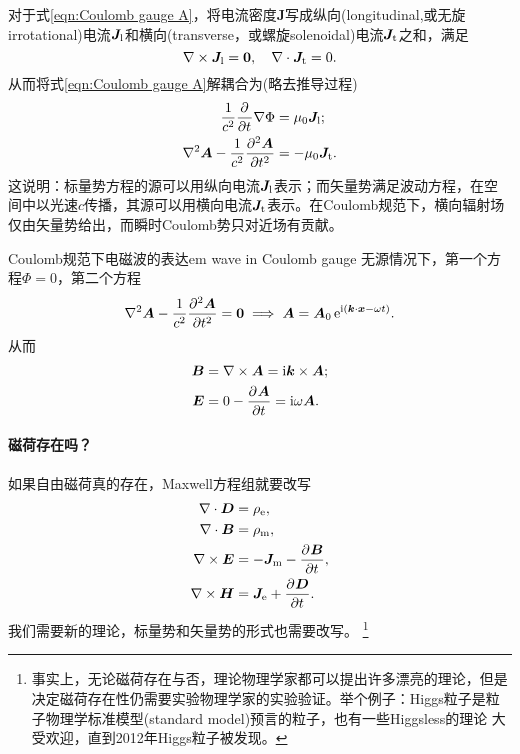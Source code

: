 对于式\eqref{eqn:Coulomb gauge A}，将电流密度$\bm J$写成纵向(longitudinal,或无旋irrotational)电流$\bm J_\text l$和横向(transverse，或螺旋solenoidal)电流$\bm J_\text t$之和，满足
\[
    \curl\bm J_\text l=\bm 0,\quad\div\bm J_\text t=0.
\]
从而将式\eqref{eqn:Coulomb gauge A}解耦合为(略去推导过程)
\begin{subequations}
    \begin{align}
        \frac1{c^2}\pp t\nabla\Phi&=\mu_0\bm J_\text l;\\
        \lapla\bm A-\frac1{c^2}\pv[2]{\bm A}t&=-\mu_0\bm J_\text t.
    \end{align}
\end{subequations}
这说明：标量势方程的源可以用纵向电流$\bm J_\text l$表示；而矢量势满足波动方程，在空间中以光速$c$传播，其源可以用横向电流$\bm J_\text t$表示。在Coulomb规范下，横向辐射场仅由矢量势给出，而瞬时Coulomb势只对近场有贡献。

\begin{example}{Coulomb规范下电磁波的表达}{em wave in Coulomb gauge}
    无源情况下，第一个方程$\Phi=0$，第二个方程
    \[
        \lapla\bm A-\frac1{c^2}\pv[2]{\bm A}t=\bm 0\implies\bm A=\bm A_0\e{\i(\bm k\cdot\bm x-\omega t)}.
    \]
    从而
    \begin{align*}
        \bm B&=\curl\bm A=\i\bm k\times\bm A;\\
        \bm E&=0-\pv{\bm A}t=\i\omega\bm A.
    \end{align*}
\end{example}
\paragraph{磁荷存在吗？}
如果自由磁荷真的存在，Maxwell方程组就要改写
\begin{align*}
    \div\bm D&=\rho_\elc,\\
    \div\bm B&=\rho_\text m,\\
    \curl\bm E&=-\bm J_\text m-\pv{\bm B}t,\\
    \curl\bm H&=\bm J_\elc+\pv{\bm D}t.
\end{align*}
我们需要新的理论，标量势和矢量势的形式也需要改写。
\footnote{事实上，无论磁荷存在与否，理论物理学家都可以提出许多漂亮的理论，但是决定磁荷存在性仍需要实验物理学家的实验验证。举个例子：Higgs粒子是粒子物理学标准模型(standard model)预言的粒子，也有一些Higgsless的理论
大受欢迎，直到2012年Higgs粒子被发现。}
